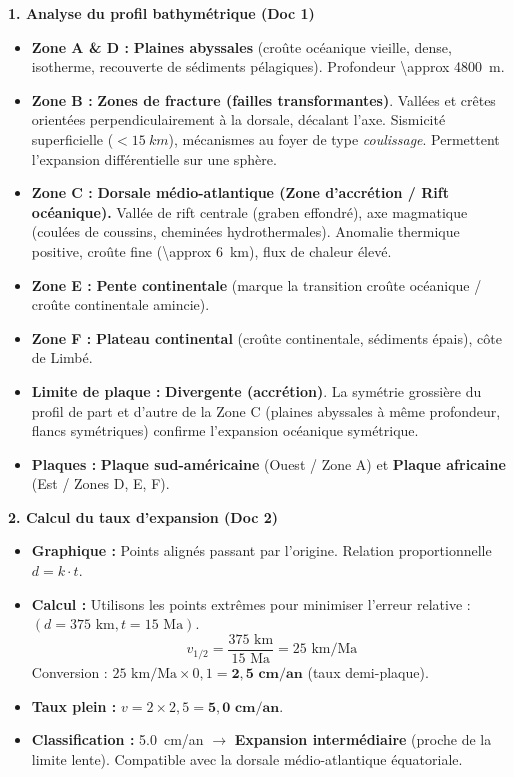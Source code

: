 \documentclass[11pt]{article}
\newcounter{popsec}
\newcounter{popsub}
\newcommand{\courssub}[1]{%
  \stepcounter{popsub}%
  \par\vspace{9pt}\noindent{\popxbold\fontsize{11.5}{13}\selectfont\color{popink}{\color{poporange}\thepopsec.\thepopsub}\hspace{6pt}#1}\par\nopagebreak\vspace{4pt}
}
\begin{document}
\courssub{Démarche et corrigé commenté}
\begin{exoresolu}
\tcblower
\textbf{1. Analyse du profil bathymétrique (Doc 1)}
\begin{itemize}
    \item \textbf{Zone A \& D :} \textbf{Plaines abyssales} (croûte océanique vieille, dense, isotherme, recouverte de sédiments pélagiques). Profondeur \SI{\approx 4800}{m}.
    \item \textbf{Zone B :} \textbf{Zones de fracture (failles transformantes)}. Vallées et crêtes orientées perpendiculairement à la dorsale, décalant l'axe. Sismicité superficielle ($< \SI{15}{km}$), mécanismes au foyer de type \emph{coulissage}. Permettent l'expansion différentielle sur une sphère.
    \item \textbf{Zone C :} \textbf{Dorsale médio-atlantique (Zone d'accrétion / Rift océanique).} Vallée de rift centrale (graben effondré), axe magmatique (coulées de coussins, cheminées hydrothermales). Anomalie thermique positive, croûte fine (\SI{\approx 6}{km}), flux de chaleur élevé.
    \item \textbf{Zone E :} \textbf{Pente continentale} (marque la transition croûte océanique / croûte continentale amincie).
    \item \textbf{Zone F :} \textbf{Plateau continental} (croûte continentale, sédiments épais), côte de Limbé.
    \item \textbf{Limite de plaque :} \textbf{Divergente (accrétion)}. La symétrie grossière du profil de part et d'autre de la Zone C (plaines abyssales à même profondeur, flancs symétriques) confirme l'expansion océanique symétrique.
    \item \textbf{Plaques :} \textbf{Plaque sud-américaine} (Ouest / Zone A) et \textbf{Plaque africaine} (Est / Zones D, E, F).
\end{itemize}

\textbf{2. Calcul du taux d'expansion (Doc 2)}
\begin{itemize}
    \item \textbf{Graphique :} Points alignés passant par l'origine. Relation proportionnelle $d = k \cdot t$.
    \item \textbf{Calcul :} Utilisons les points extrêmes pour minimiser l'erreur relative : $(d=375 \text{ km}, t=15 \text{ Ma})$.
    \[ v_{1/2} = \frac{375 \text{ km}}{15 \text{ Ma}} = 25 \text{ km/Ma} \]
    Conversion : $25 \text{ km/Ma} \times 0,1 = \mathbf{2,5 \text{ cm/an}}$ (taux demi-plaque).
    \item \textbf{Taux plein :} $v = 2 \times 2,5 = \mathbf{5,0 \text{ cm/an}}$.
    \item \textbf{Classification :} \SI{5,0}{cm/an} $\rightarrow$ \textbf{Expansion intermédiaire} (proche de la limite lente). Compatible avec la dorsale médio-atlantique équatoriale.
\end{itemize}


\end{exoresolu}
\end{document}
